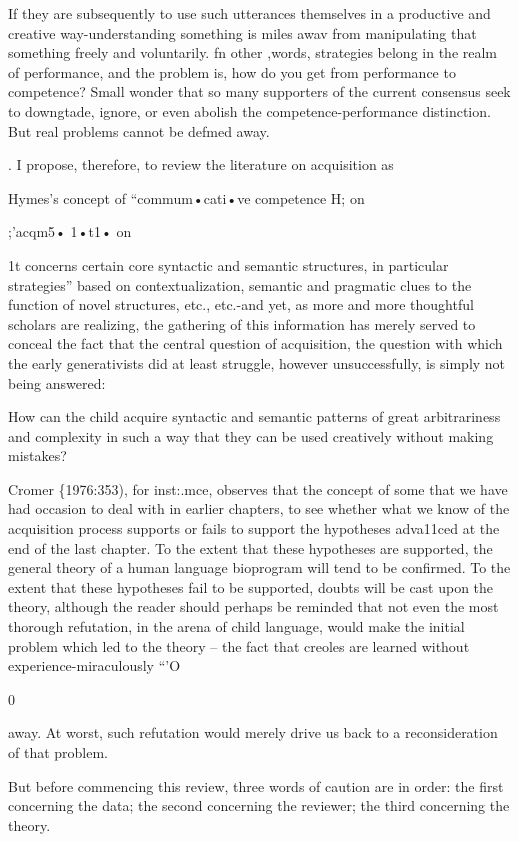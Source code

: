 If they are subsequently to use such utterances themselves in a produc\-tive and creative way-understanding something is miles awav from manipulating that something freely and voluntarily. fn other ,words, strategies belong in the realm of performance, and the problem is, how do you get from performance to competence? Small wonder that so many supporters of the current consensus seek to downgtade, ignore,
or even abolish the competence-performance distinction. But real problems cannot be defmed away.

. I propose, therefore, to review the literature on acquisition as

Hymes's concept of ``commum•cati•ve competence H; on

;'acqm5• 1•t1• on

1t concerns certain core syntactic and semantic structures, in particular
strategies'' based on contextualization, semantic and pragmatic clues to the function of novel structures, etc., etc.-and yet, as more and more thoughtful scholars are realizing, the gathering of this information has merely served to conceal the fact that the central question of acquisition, the question with which the early generativists did at least struggle, however unsuccessfully, is simply not being answered:

How can the child acquire syntactic and semantic patterns of great arbitrariness and complexity in such a way that they can be used creatively without making mistakes?

Cromer \{1976:353), for inst:.mce, observes that the concept of
some that we have had occasion to deal with in earlier chapters, to see whether what we know of the acquisition process supports or fails to support the hypotheses adva11ced at the end of the last chapter. To the extent that these hypotheses are supported, the general theory of a human language bioprogram will tend to be confirmed. To the
extent that these hypotheses fail to be supported, doubts will be cast upon the theory, although the reader should perhaps be reminded that not even the most thorough refutation, in the arena of child language, would make the initial problem which led to the theory --
the fact that creoles are learned without experience-miraculously ``'O

0

away. At worst, such refutation would merely drive us back to a
reconsideration of that problem.


But before commencing this review, three words of caution are in order: the first concerning the data; the second concerning the reviewer; the third concerning the theory.

